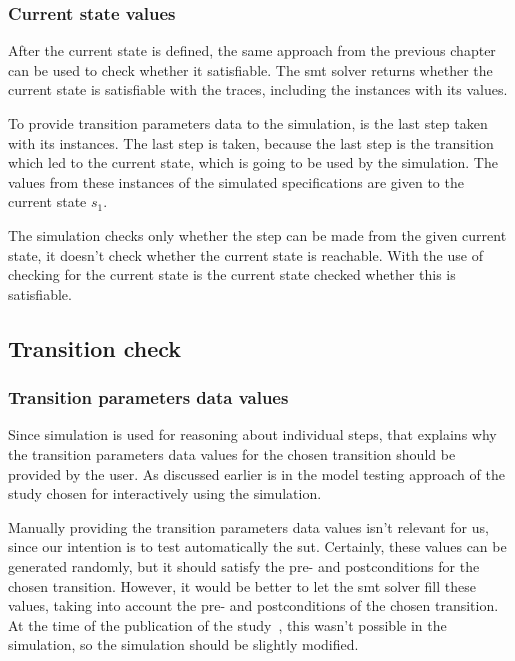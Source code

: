 \subsubsection*{Current state values}
After the current state is defined, the same approach from the previous chapter
can be used to check whether it satisfiable. The \gls{smt} solver returns whether the
current state is satisfiable with the traces, including the instances with its
values.

To provide transition parameters data to the simulation, is the last step taken
with its instances. The last step is taken, because the last step is the
transition which led to the current state, which is going to be used by the
simulation. The values from these instances of the simulated specifications are
given to the current state $s_{1}$.

The simulation checks only whether the step can be made from the given current
state, it doesn't check whether the current state is reachable. With the use of
checking for the current state is the current state checked whether this is
satisfiable.

\subsection{Transition check}

\subsubsection*{Transition parameters data values}
Since simulation is used for reasoning about individual steps, that explains why
the transition parameters data values for the chosen transition should be
provided by the user. As discussed earlier is in the model testing approach
of the study \cite[p.6]{stoel_storm_vinju_bosman_2016} chosen for interactively
using the simulation.

Manually providing the transition parameters data values
isn't relevant for us, since our intention is to test automatically the \gls{sut}.
Certainly, these values can be generated randomly, but it should satisfy the
pre- and postconditions for the chosen transition. However, it would be
better to let the \gls{smt} solver fill these values, taking into account the pre- and
postconditions of the chosen transition. At the time of the publication of the
study~\cite{stoel_storm_vinju_bosman_2016}, this wasn't possible in the simulation, so
the simulation should be slightly modified.

